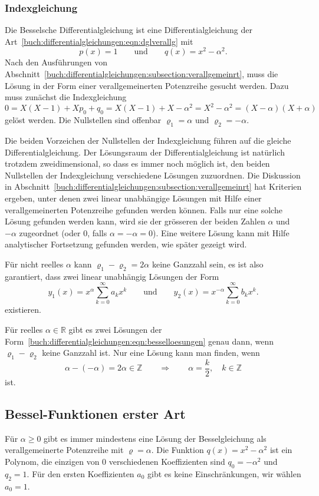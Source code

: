 \subsubsection{Indexgleichung}
Die Besselsche Differentialgleichung ist eine Differentialgleichung
der Art~\eqref{buch:differentialgleichungen:eqn:dglverallg} mit
\[
p(x) = 1
\qquad\text{und}\qquad
q(x) = x^2-\alpha^2.
\]
Nach den Ausführungen von
Abschnitt~\ref{buch:differentialgleichungen:subsection:verallgemeinrt},
muss die Lösung in der Form einer verallgemeinerten Potenzreihe 
gesucht werden.
Dazu muss zunächst die Indexgleichung
\[
0
=
X(X-1) + Xp_0 + q_0
=
X(X-1) + X - \alpha^2
=
X^2-\alpha^2
=
(X-\alpha)(X+\alpha)
\]
gelöst werden.
Die Nullstellen sind offenbar $\varrho_1=\alpha$ und $\varrho_2=-\alpha$.

Die beiden Vorzeichen der Nullstellen der Indexgleichung führen
auf die gleiche Differentialgleichung.
Der Lösungsraum der Differentialgleichung ist natürlich trotzdem
zweidimensional, so dass es immer noch möglich ist, den
beiden Nullstellen der Indexgleichung verschiedene Lösungen
zuzuordnen.
Die Diskussion in
Abschnitt~\ref{buch:differentialgleichungen:subsection:verallgemeinrt}
hat Kriterien ergeben, unter denen zwei linear unabhängige Lösungen
mit Hilfe einer verallgemeinerten Potenzreihe gefunden werden können.
Falls nur eine solche Lösung gefunden werden kann, wird sie der grösseren
der beiden Zahlen $\alpha$ und $-\alpha$ zugeordnet
(oder $0$, falls $\alpha=-\alpha=0$).
Eine weitere Lösung kann mit Hilfe analytischer Fortsetzung gefunden werden,
wie später gezeigt wird.

Für nicht reelles $\alpha$ kann $\varrho_1-\varrho_2=2\alpha$ keine 
Ganzzahl sein, es ist also garantiert, dass zwei linear unabhängig
Lösungen der Form
\begin{equation}
y_1(x) = x^\alpha\sum_{k=0}^\infty a_kx^k
\qquad\text{und}\qquad
y_2(x) = x^{-\alpha}\sum_{k=0}^\infty b_kx^k.
\label{buch:differentialgleichungen:eqn:besselloesungen}
\end{equation}
existieren.

Für reelles $\alpha\in\mathbb{R}$ gibt es zwei Lösungen der
Form~\eqref{buch:differentialgleichungen:eqn:besselloesungen}
genau dann, wenn $\varrho_1-\varrho_2$ keine Ganzzahl ist.
Nur eine Lösung kann man finden, wenn 
\[
\alpha-(-\alpha)=2\alpha \in \mathbb{Z}
\qquad\Rightarrow\qquad
\alpha = \frac{k}{2},\quad k\in\mathbb{Z}
\]
ist.



\subsection{Bessel-Funktionen erster Art}
Für $\alpha \ge 0$ gibt es immer mindestens eine Lösung der Besselgleichung
als verallgemeinerte Potenzreihe mit $\varrho=\alpha$.
Die Funktion $q(x)=x^2-\alpha^2$ ist ein Polynom, die einzigen
von $0$ verschiedenen Koeffizienten sind $q_0=-\alpha^2$
und $q_2=1$.
Für den ersten Koeffizienten $a_0$ gibt es keine Einschränkungen,
wir wählen $a_0=1$.

